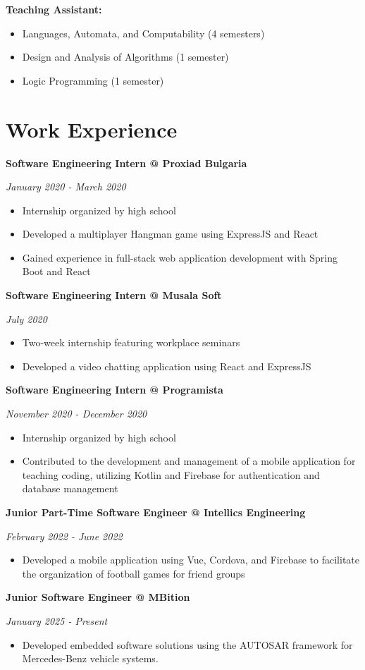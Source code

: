 \documentclass[a4paper,10pt]{article}
\begin{document}
\textbf{Teaching Assistant:}
\begin{itemize}
    \item Languages, Automata, and Computability (4 semesters)
    \item Design and Analysis of Algorithms (1 semester)
    \item Logic Programming (1 semester)
\end{itemize}

\section*{Work Experience}

\textbf{Software Engineering Intern @ Proxiad Bulgaria}

\textit{January 2020 - March 2020}
\begin{itemize}
    \item Internship organized by high school
    \item Developed a multiplayer Hangman game using ExpressJS and React
    \item Gained experience in full-stack web application development with Spring Boot and React
\end{itemize}

\textbf{Software Engineering Intern @ Musala Soft}

\textit{July 2020}
\begin{itemize}
    \item Two-week internship featuring workplace seminars
    \item Developed a video chatting application using React and ExpressJS
\end{itemize}

\textbf{Software Engineering Intern @ Programista}

\textit{November 2020 - December 2020}
\begin{itemize}
    \item Internship organized by high school
    \item Contributed to the development and management of a mobile application for teaching coding, utilizing Kotlin and Firebase for authentication and database management
\end{itemize}

\textbf{Junior Part-Time Software Engineer @ Intellics Engineering}

\textit{February 2022 - June 2022}
\begin{itemize}
    \item Developed a mobile application using Vue, Cordova, and Firebase to facilitate the organization of football games for friend groups
\end{itemize}

\textbf{Junior Software Engineer @ MBition}

\textit{January 2025 - Present}
\begin{itemize}
    \item Developed embedded software solutions using the AUTOSAR framework for Mercedes-Benz vehicle systems.
\end{itemize}
\end{document}
